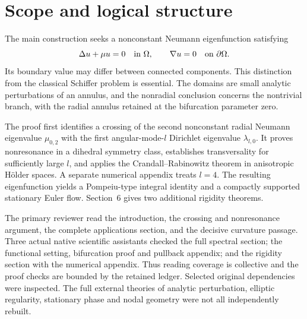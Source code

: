 \documentclass[10pt]{article}
\begin{document}
\section*{Scope and logical structure}
The main construction seeks a nonconstant Neumann eigenfunction satisfying \[\Delta u+\mu u=0\quad\hbox{in }\Omega,\qquad
 \nabla u=0\quad\hbox{on }\partial\Omega.\] Its boundary value may differ between connected components. This distinction from the classical Schiffer problem is essential. The domains are small analytic perturbations of an annulus, and the nonradial conclusion concerns the nontrivial branch, with the radial annulus retained at the bifurcation parameter zero.\par
The proof first identifies a crossing of the second nonconstant radial Neumann eigenvalue \(\mu_{0,2}\) with the first angular-mode-\(l\) Dirichlet eigenvalue \(\lambda_{l,0}\). It proves nonresonance in a dihedral symmetry class, establishes transversality for sufficiently large \(l\), and applies the Crandall–Rabinowitz theorem in anisotropic Hölder spaces. A separate numerical appendix treats \(l=4\). The resulting eigenfunction yields a Pompeiu-type integral identity and a compactly supported stationary Euler flow. Section 6 gives two additional rigidity theorems.\par
The primary reviewer read the introduction, the crossing and nonresonance argument, the complete applications section, and the decisive curvature passage. Three actual native scientific assistants checked the full spectral section; the functional setting, bifurcation proof and pullback appendix; and the rigidity section with the numerical appendix. Thus reading coverage is collective and the proof checks are bounded by the retained ledger. Selected original dependencies were inspected. The full external theories of analytic perturbation, elliptic regularity, stationary phase and nodal geometry were not all independently rebuilt.\par
\end{document}
